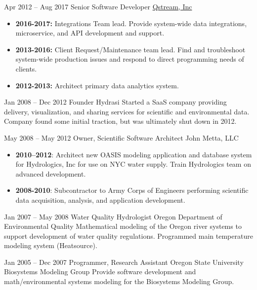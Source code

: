 \documentclass[letterpaper]{twentysecondcv} %
\begin{document}
\begin{twenty} %
\twentyitem
    	{Apr 2012 –}
	{Aug 2017}
        {Senior Software Developer}
        {\href{http://www.qstream.com/}{Qstream, Inc}}
        {}
        {\begin{itemize}
        \item\textbf{2016-2017:} Integrations Team lead. Provide system-wide data \mbox{integrations}, microservice, and API development and support.
        \item\textbf{2013-2016:} Client Request/Maintenance team lead. Find and troubleshoot system-wide production issues and respond to direct \mbox{programming} needs of clients.
        \item\textbf{2012-2013:} Architect primary data analytics system.
        \end{itemize}
        }

	\twentyitem
    	{Jan 2008 – }
	{Dec 2012}
        {Founder}
        {Hydrasi}
        {}
        {Started a SaaS company providing delivery, visualization, and sharing services for scientific and environmental data. Company found some initial traction, but was ultimately shut down in 2012.}

	\twentyitem
    	{May 2008 –}
	{May 2012}
        {Owner, Scientific Software Architect}
        {John Metta, LLC}
        {}
        {\begin{itemize}
        \item\textbf{2010–2012}: Architect new OASIS modeling application and database system for Hydrologics, Inc for use on NYC water supply. Train Hydrologics team on advanced development.
        \item\textbf{2008-2010}: Subcontractor to Army Corps of Engineers performing scientific data acquisition, analysis, and application development.
        \end{itemize}
        }

	\twentyitem
    	{Jan 2007 –}
	{May 2008}
        {Water Quality Hydrologist}
        {Oregon Department of Environmental Quality}
        {}
        {Mathematical modeling of the Oregon river systems to support \mbox{development} of water quality regulations. Programmed main \mbox{temperature} modeling system (Heatsource).}
        
        \twentyitem
        {Jan 2005 –}
        {Dec 2007}
        {Programmer, Research Assistant}
        {Oregon State University}
        {Biosystems Modeling Group}
        {Provide software development and math/environmental systems modeling for the Biosystems Modeling Group.}
        

\end{twenty}
\end{document}
